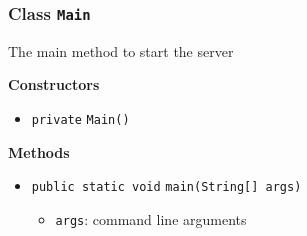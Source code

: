 \subsubsection{Class \lstinline|Main|}
The main method to start the server \\
\noindent\begin{minipage}[t]{5cm}
\vspace{0.3em}
\hspace*{2em}
\vspace{0.3em}
\end{minipage}




\textbf{\sffamily Constructors}
\begin{itemize}
\item \lstinline|private| \lstinline|Main|\lstinline|()| \\[-0.6em]




\end{itemize}


\textbf{\sffamily Methods}
\begin{itemize}
\item \lstinline|public static void| \lstinline|main|\lstinline|(String[] args)| \\[-0.6em]

\begin{itemize}
\item \lstinline|args|: command line arguments
\end{itemize}



\end{itemize}


